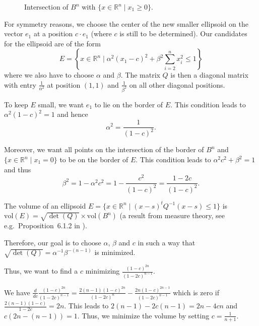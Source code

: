 \documentclass[12pt, showidx, twoside]{article}
\def\R{\mathbb{R}}
\newcommand{\vol}{\text{vol}}
\begin{document}
{{{\begin{figure}[htb]
\begin{center}
\end{center}
\caption{Intersection of $B^n$ with $\{x \in \R^n \mid x_1 \geq 0\}$.}
\label{fig::half-ball}
\end{figure}


For symmetry reasons, we choose the center of the new smaller ellipsoid on the
vector $e_1$ at a position $c \cdot e_1$ (where $c$ is still to be determined).
Our candidates for the ellipsoid are of the form 
\[
E=\left\{x \in \R^n \mid \alpha^2 (x_1 - c)^2 + \beta^2 \sum_{i=2}^n x_i^2 \leq 1\right\}
\]
where we also have to choose $\alpha$ and $\beta$. The matrix
$Q$ is then a diagonal matrix with entry $\frac{1}{\alpha^2}$ at 
position $(1,1)$ and $\frac{1}{\beta^2}$ on all other diagonal positions.


To keep $E$ small, we want $e_1$ to lie on the border of $E$.
This condition leads to $\alpha^2(1-c)^2=1$ and hence
\begin{equation}
\alpha^2 = \frac{1}{(1-c)^2}.
\end{equation}

Moreover, we want all points on the intersection of
the border of $B^n$ and $\{x\in \R^n \mid x_1 = 0 \}$ to be
on the border of  $E$. This condition leads to
$\alpha^2 c^2 + \beta^2 = 1$ and thus
\begin{equation}
  \beta^2 = 1 -\alpha^2 c^2 = 1- \frac{c^2}{(1-c)^2} = \frac{1-2c}{(1-c)^2}.
\end{equation}


The volume of an ellipsoid 
$E = \{x \in \R^n \mid (x - s)^t Q^{-1} (x-s) \leq 1\}$
is 
$\vol(E) = \sqrt{\det(Q)} \times \vol(B^n)$ (a result from measure
theory, see e.g.\ Proposition~6.1.2 in \cite{Coh80}).


Therefore, our goal is to choose $\alpha$, $\beta$ and $c$ in 
such a way that $\sqrt{\det(Q)} = \alpha^{-1}\beta^{-(n-1)}$ is minimized.

Thus, we want to find a $c$ minimizing
$\frac{(1-c)^{2n}}{(1-2c)^{n-1}}$.

We have $\frac{d}{dc} \frac{(1-c)^{2n}}{(1-2c)^{n-1}}
= \frac{2(n-1)(1-c)^{2n}}{(1-2c)^n} - \frac{2n(1-c)^{2n-1}}{(1-2c)^{n-1}}$
which is zero if $\frac{2(n-1)(1-c)}{1-2c} = 2n$.
This leads to $2(n-1) - 2c(n-1) = 2n - 4cn$ and
$c(2n - (n-1)) = 1$.
Thus, we minimize the volume by setting $c=\frac{1}{n+1}$.

}}}
\end{document}
